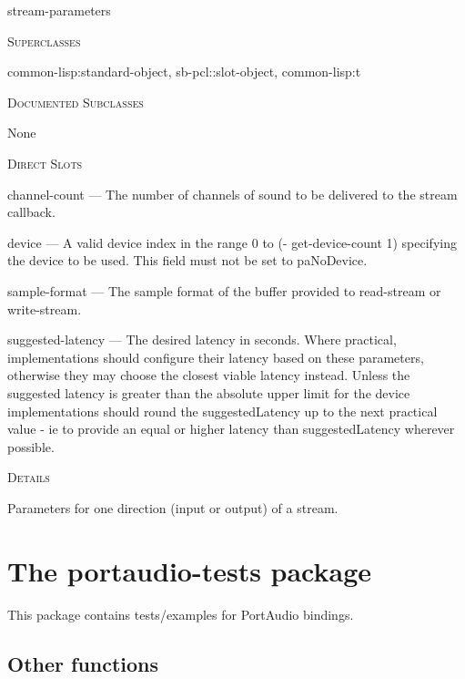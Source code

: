 \documentclass[a4paper]{report}
\begin{document}
    \label{portaudio__class__stream-parameters}
    \begin{defun}[Class]
    stream-parameters


      
    \bigskip
    \textsc{Superclasses}

\color[rgb]{0.5,0.5,0.5}common-lisp:standard-object\color[rgb]{0,0,0}, \color[rgb]{0.5,0.5,0.5}sb-pcl::slot-object\color[rgb]{0,0,0}, \color[rgb]{0.5,0.5,0.5}common-lisp:t\color[rgb]{0,0,0}


      
    \bigskip
    \textsc{Documented Subclasses}


	    None
	  


	
    \bigskip
    \textsc{Direct Slots}

channel-count --- The number of channels of sound to be delivered to the stream callback.

device --- A valid device index in the range 0 to (- get-device-count 1) specifying the device to be used. This field must not be set to paNoDevice.

sample-format --- The sample format of the buffer provided to read-stream or write-stream.

suggested-latency --- The desired latency in seconds. Where practical, implementations should configure their latency based on these parameters, otherwise they may choose the closest viable latency instead. Unless the suggested latency is greater than the absolute upper limit for the device implementations should round the suggestedLatency up to the next practical value - ie to provide an equal or higher latency than suggestedLatency wherever possible.




	
    \bigskip
    \textsc{Details}

Parameters for one direction (input or output) of a stream.


    
    \end{defun}
  
  
    \chapter{The portaudio-tests package}
    This package contains tests/examples for PortAudio bindings.
      \section{Other functions}
      
\end{document}
